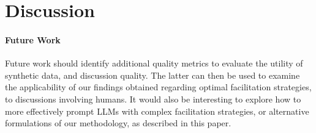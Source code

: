%
\section{Discussion}
\paragraph{Future Work}Future work should identify additional quality metrics to evaluate the utility of synthetic data, and discussion quality. The latter can then be used to examine the applicability of our findings obtained regarding optimal facilitation strategies, to discussions involving humans. It would also be interesting to explore how to more effectively prompt LLMs with complex facilitation strategies, or alternative formulations of our methodology, as described in this paper.